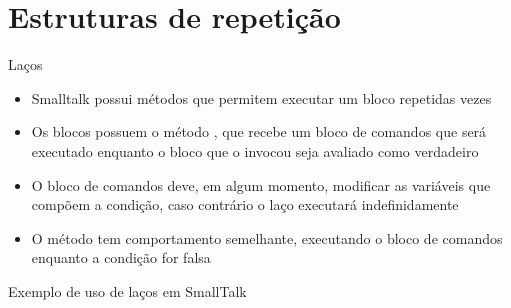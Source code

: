 \section{Estruturas de repetição}

\begin{frame}[fragile]{Laços}

    \begin{itemize}
        \item Smalltalk possui métodos que permitem executar um bloco repetidas vezes

        \item Os blocos possuem o método , que recebe um bloco de
            comandos que será executado enquanto o bloco que o invocou seja avaliado como
            verdadeiro


        \item O bloco de comandos deve, em algum momento, modificar as variáveis que compõem a
            condição, caso contrário o laço executará indefinidamente

        \item O método  tem comportamento semelhante, executando o
            bloco de comandos enquanto a condição for falsa


    \end{itemize}

\end{frame}

\begin{frame}[fragile]{Exemplo de uso de laços em SmallTalk}
\end{frame}

